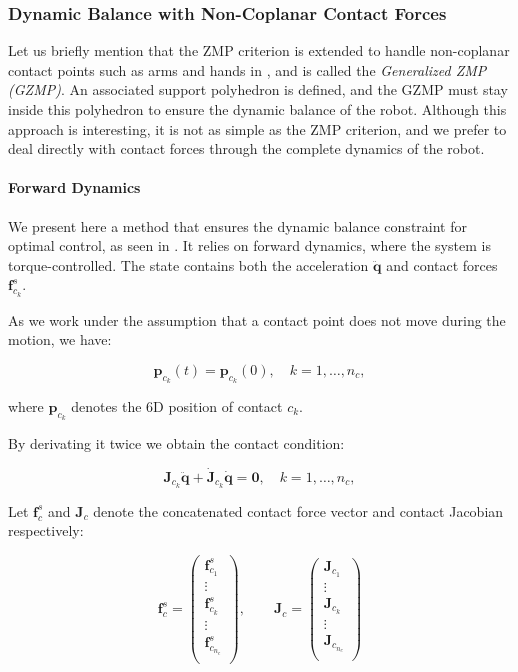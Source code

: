 \subsubsection{Dynamic Balance with Non-Coplanar Contact Forces}

Let us briefly mention that the ZMP criterion is extended to handle
non-coplanar contact points such as arms and hands in
\cite{harada2003zmp}, and is called the \emph{Generalized ZMP
  (GZMP)}. An associated support polyhedron is defined, and the GZMP
must stay inside this polyhedron to ensure the dynamic balance of the
robot. Although this approach is interesting, it is not as simple as
the ZMP criterion, and we prefer to deal directly with contact forces
through the complete dynamics of the robot.

\paragraph{Forward Dynamics}

We present here a method that ensures the dynamic balance constraint
for optimal control, as seen in \cite{mombaur2005open}. It relies on
forward dynamics, where the system is torque-controlled. The state
contains both the acceleration $\ddot{\mathbf{q}}$ and contact forces
$\mathbf{f}^s_{c_k}$. 

As we work under the assumption that a contact point does not move
during the motion, we have:

\begin{equation}
\mathbf{p}_{c_k}(t)=\mathbf{p}_{c_k}(0),\quad k = 1,\ldots,n_c,
\end{equation}

where $\mathbf{p}_{c_k}$ denotes the 6D position of contact $c_k$.

By derivating it twice we obtain the contact condition:

\begin{equation}
\mathbf{J}_{c_k}\ddot{\mathbf{q}} +
\dot{\mathbf{J}}_{c_k}\dot{\mathbf{q}}=\mathbf{0}, \quad k = 1,\ldots,n_c,
\end{equation}

Let $\mathbf{f}^s_c$ and $\mathbf{J}_c$ denote the concatenated
contact force vector and contact Jacobian respectively:

\begin{equation}
\mathbf{f}^s_c=
\left(\begin{matrix}
\mathbf{f}^s_{c_1}\\
\vdots\\
\mathbf{f}^s_{c_k}\\
\vdots\\
\mathbf{f}^s_{c_{n_c}}\\
\end{matrix}\right),
\qquad
\mathbf{J}_c=
\left(\begin{matrix}
\mathbf{J}_{c_1}\\
\vdots\\
\mathbf{J}_{c_k}\\
\vdots\\
\mathbf{J}_{c_{n_c}}\\
\end{matrix}\right)
\end{equation}

